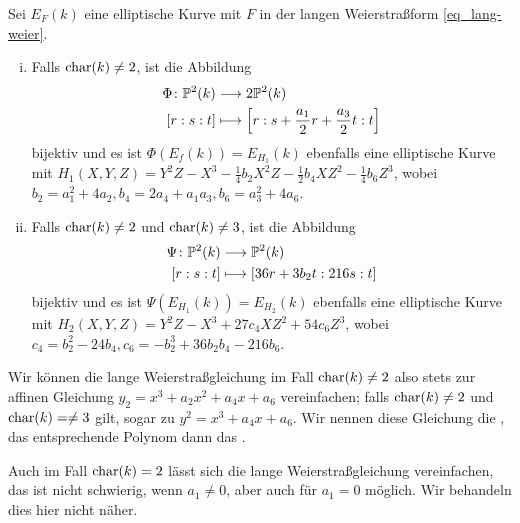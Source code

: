 \begin{satz}
\label{satz_11.8}
	Sei $E_F(k)$ eine elliptische Kurve mit $F$ in der langen Weierstraßform \eqref{eq_lang-weier}. 
	\begin{enumerate}[(i)]
		\item Falls $\operatorname{char}(k) \neq 2$, ist die Abbildung
		\begin{equation}
		\begin{aligned}
			\Phi \colon \mathbb{P}^2(k) &\longrightarrow 2\mathbb{P}^2(k) \\
			[r:s:t] &\longmapsto \left\lbrack r : s + \frac{a_1}{2}r + \frac{a_3}{2}t : t\right\rbrack
		\end{aligned}
		\end{equation}
		bijektiv und es ist $\Phi(E_f(k)) = E_{H_1}(k)$ ebenfalls eine elliptische Kurve mit $H_1(X,Y,Z) = Y^2Z - X^3 - \frac{1}{4}b_2 X^2Z - \frac{1}{2} b_4 XZ^2 - \frac{1}{4} b_6 Z^3$, wobei $b_2 = a_1^2 + 4a_2, b_4 = 2a_4 + a_1 a_3, b_6 = a_3^2 + 4a_6$.
		\item Falls $\operatorname{char}(k) \neq 2$ und $\operatorname{char}(k) \neq 3$, ist die Abbildung
		\begin{equation}
		\begin{aligned}
			\Psi\colon \mathbb{P}^2(k) &\longrightarrow \mathbb{P}^2(k) \\
			[r:s:t] &\longmapsto [36r + 3b_2 t : 216s : t]
		\end{aligned}
		\end{equation}
		bijektiv und es ist $\Psi(E_{H_1}(k)) = E_{H_2}(k)$ ebenfalls eine elliptische Kurve mit $H_2(X,Y,Z) = Y^2Z - X^3 + 27c_4 XZ^2 + 54 c_6 Z^3$, wobei $c_4 = b_2^2 - 24b_4, c_6 = -b_2^3 + 36b_2b_4 - 216b_6$.
	\end{enumerate}
\end{satz}

\begin{bem}
	Wir können die lange Weierstraßgleichung im Fall $\operatorname{char}(k) \neq 2$ also stets zur affinen Gleichung $y_2 = x^3 + a_2x^2 + a_4 x + a_6$ vereinfachen; falls $\operatorname{char}(k) \neq 2$ und $\operatorname{char}(k)= \neq 3$ gilt, sogar zu $y^2 = x^3 + a_4 x + a_6$. 
	Wir nennen diese Gleichung die , das entsprechende Polynom dann das .
\end{bem}

\begin{bem}
	Auch im Fall $\operatorname{char}(k) = 2$ lässt sich die lange Weierstraßgleichung vereinfachen, das ist nicht schwierig, wenn $a_1 \neq 0$, aber auch für $a_1 = 0$ möglich. 
	Wir behandeln dies hier nicht näher.
\end{bem}

